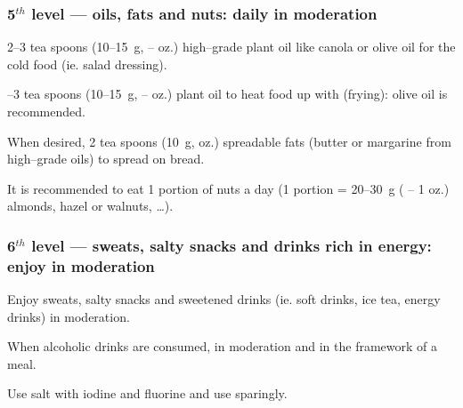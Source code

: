 \documentclass[../main.tex]{subfiles}
\begin{document}
\subsubsection{5$^{th}$ level --- oils, fats and nuts: daily in moderation}

2--3 tea spoons (10--\SI{15}{\gram},  --  oz.) high--grade plant oil like canola or olive oil for the cold food (ie. salad dressing).

--3 tea spoons (10--\SI{15}{\gram},  --  oz.)  plant oil to heat food up with (frying): olive oil is recommended.

\noindent When desired, 2 tea spoons (\SI{10}{\gram},  oz.)  spreadable fats (butter or margarine from high--grade oils) to spread on bread.

\noindent It is recommended to eat 1 portion of nuts a day (1 portion = 20--\SI{30}{\gram} ( -- 1 oz.) almonds, hazel or walnuts, \ldots).


\subsubsection{6$^{th}$ level --- sweats, salty snacks and drinks rich in energy: enjoy in moderation}

Enjoy sweats, salty snacks and sweetened drinks (ie. soft drinks, ice tea, energy drinks) in moderation.

\noindent When alcoholic drinks are consumed, in moderation and in the framework of a meal.

\noindent Use salt with iodine and fluorine and use sparingly.
\end{document}

